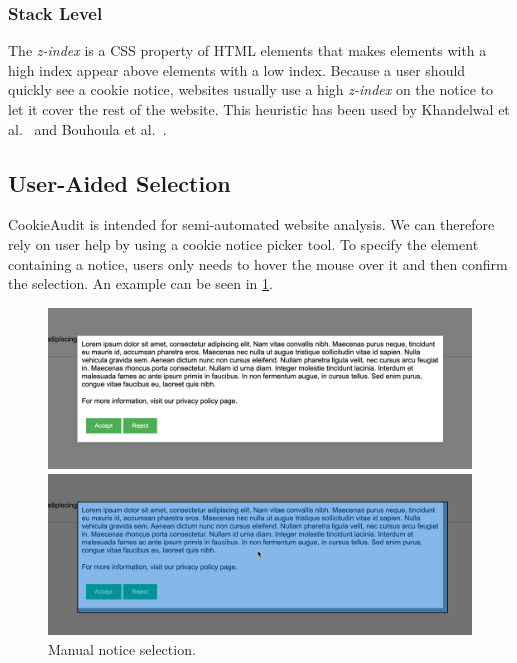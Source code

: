 \subsubsection{Stack Level}
The \emph{z-index} is a CSS property of HTML elements that makes elements with a high index appear above elements with a low index. 
Because a user should quickly see a cookie notice, websites usually use a high \emph{z-index} on the notice to let it cover the rest of the website. 
This heuristic has been used by Khandelwal et al.~\cite{khandelwal2023automated} and Bouhoula et al.~\cite{bouhoula2023automated}.

\subsection{User-Aided Selection} \label{subsec:user-aided-selection}
CookieAudit is intended for semi-automated website analysis.
We can therefore rely on user help by using a cookie notice picker tool.
To specify the element containing a notice, users only needs to hover the mouse over it and then confirm the selection. 
An example can be seen in \cref{fig:screenshot-selection}.

\begin{figure}
	\centering
	\begin{minipage}{0.48\textwidth}
		\centering
		\includegraphics[width=1.0\linewidth]{media/screenshot_unselected.png}
	\end{minipage}\hfill
	\begin{minipage}{0.48\textwidth}
		\centering
		\includegraphics[width=1.0\linewidth]{media/screenshot_selected.png}      
	\end{minipage}
	\caption{Manual notice selection.}
	\label{fig:screenshot-selection}
\end{figure}

